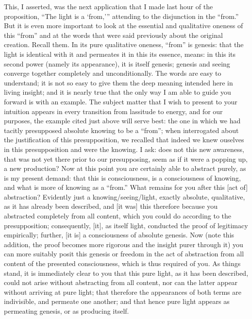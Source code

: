 This, I asserted, was the next application
that I made last hour of the proposition,
“The light is a ‘from,'” attending to
the disjunction in the “from.”
But it is even more important to look at
the essential and qualitative oneness of this “from”
and at the words that were said previously
about the original creation.
Recall them.
In its pure qualitative oneness,
“from” is genesis:
that the light is identical with it
and permeates it in this its essence, means:
in this its second power (namely its appearance),
it is itself genesis;
genesis and seeing converge together
completely and unconditionally.
The words are easy to understand;
it is not so easy to give them the deep meaning
intended here in living insight;
and it is nearly true that the only way I am able
to guide you forward is with an example.
The subject matter that I wish to
present to your intuition appears
in every transition from lassitude to energy,
and for our purposes, the example cited
just above will serve best:
the one in which we had tacitly presupposed
absolute knowing to be a “from”;
when interrogated about the justification
of this presupposition,
we recalled that indeed we knew ouselves
in this presupposition and were the knowing.
I ask:
does not this new awareness,
that was not yet there prior to our presupposing,
seem as if it were a popping up, a new production?
Now at this point you are certainly able to abstract purely,
as is my present demand:
that this is consciousness,
is a consciousness of knowing,
and what is more of knowing as a “from.”
What remains for you after this [act of] abstraction?
Evidently just a knowing/seeing/light,
exactly absolute, qualitative, as it has already been described,
and [it was] this therefore because
you abstracted completely from all content,
which you could do according to the presupposition;
consequently, [it], as itself light, conducted
the proof of legitimacy empirically;
further, [it is] a consciousness of absolute genesis.
Now (note this addition, the proof becomes more rigorous
and the insight purer through it)
you can more suitably posit this genesis or freedom
in the act of abstraction from all content
of the presented consciousness,
which is thus required of you.
As things stand, it is immediately clear to you
that this pure light, as it has been described,
could not arise without abstracting from all content,
nor can the latter appear without arriving at pure light;
that therefore the appearances of both terms are indivisible,
and permeate one another;
and that hence pure light appears as permeating genesis,
or as producing itself.
